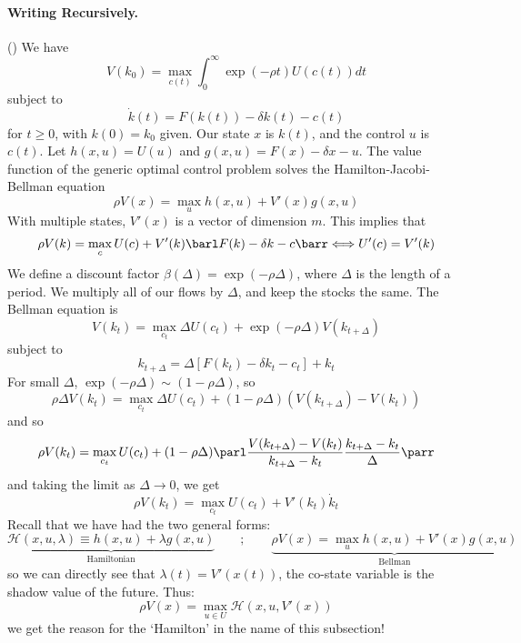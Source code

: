 \documentclass[10pt]{article}
\begin{document}
\paragraph{Writing Recursively.} () We have \[V(k_0) = \max_{c(t)} \int_0^\infty \exp(-\rho t) U(c(t))dt\]subject to\[\dot{k}(t) = F(k(t)) - \delta k(t) - c(t)\]for $t\ge 0$, with $k(0)=k_0$ given. Our state $x$ is $k(t)$, and the control $u$ is $c(t)$. Let $h(x,u) = U(u)$ and $g(x,u) = F(x) - \delta x - u$. The value function of the generic optimal control problem solves the Hamilton-Jacobi-Bellman equation \[\rho V(x) = \max_u h(x,u) + V'(x)g(x,u)\]With multiple states, $V'(x)$ is a vector of dimension $m$. This implies that \[\rho V(k) = \max_{c} U(c) + V'(k) \barl F(k) - \delta k - c\barr \Longleftrightarrow U'(c) = V'(k)\]We define a discount factor $\beta(\Delta) = \exp(-\rho \Delta)$, where $\Delta$ is the length of a period. We multiply all of our flows by $\Delta$, and keep the stocks the same. The Bellman equation is \[V(k_t) = \max_{c_t} \Delta U(c_t)  + \exp(-\rho\Delta)V(k_{t+\Delta})\]subject to\[k_{t+\Delta} = \Delta[F(k_t) - \delta k_t - c_t] + k_t\]For small $\Delta$, $\exp(-\rho \Delta) \sim (1-\rho \Delta)$, so \[\rho \Delta V(k_t) = \max_{c_t} \Delta U(c_t) + (1-\rho\Delta)(V(k_{t+\Delta}) - V(k_t))\]and so\[\rho V(k_t) = \max_{c_t}U(c_t) + (1-\rho\Delta) \parl \frac{V(k_{t+\Delta}) - V(k_t)}{k_{t+\Delta} - k_t} \frac{k_{t+\Delta} - k_t}{\Delta}\parr\]and taking the limit as $\Delta \to 0$, we get \[\rho V(k_t) = \max_{c_t} U(c_t) + V'(k_t) \dot{k}_t\]Recall that we have had the two general forms:
\[
\underbrace{\mathcal{H}(x,u,\lambda)\equiv h(x,u) + \lambda g(x,u)}_{\text{Hamiltonian}} \qquad ; \qquad \underbrace{\rho V(x) = \max_u h(x,u) + V'(x)g(x,u)}_{\text{Bellman}}
\]
so we can directly see that $\lambda(t) = V'(x(t))$, the co-state variable is the shadow value of the future. Thus:\[\rho V(x) = \max_{u \in U} \mathcal{H}(x,u,V'(x))\]we get the reason for the `Hamilton' in the name of this subsection!
\end{document}
